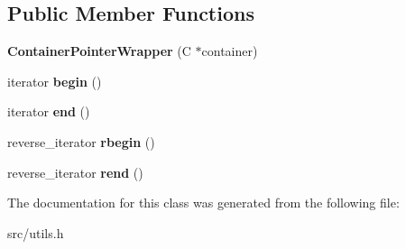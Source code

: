 \subsection*{Public Member Functions}
\begin{DoxyCompactItemize}
\item 
\hypertarget{classv8_1_1internal_1_1_container_pointer_wrapper_a42e8d763ac8c248f1d691b44f24d027d}{}{\bfseries Container\+Pointer\+Wrapper} (C $\ast$container)\label{classv8_1_1internal_1_1_container_pointer_wrapper_a42e8d763ac8c248f1d691b44f24d027d}

\item 
\hypertarget{classv8_1_1internal_1_1_container_pointer_wrapper_a7428d83a7ed448222fbb05c83883f88c}{}iterator {\bfseries begin} ()\label{classv8_1_1internal_1_1_container_pointer_wrapper_a7428d83a7ed448222fbb05c83883f88c}

\item 
\hypertarget{classv8_1_1internal_1_1_container_pointer_wrapper_aff211e5a08e2fa08945806955dc7d71b}{}iterator {\bfseries end} ()\label{classv8_1_1internal_1_1_container_pointer_wrapper_aff211e5a08e2fa08945806955dc7d71b}

\item 
\hypertarget{classv8_1_1internal_1_1_container_pointer_wrapper_a3ce6f3e2bdba0ddea8d91451bf1a9fc8}{}reverse\+\_\+iterator {\bfseries rbegin} ()\label{classv8_1_1internal_1_1_container_pointer_wrapper_a3ce6f3e2bdba0ddea8d91451bf1a9fc8}

\item 
\hypertarget{classv8_1_1internal_1_1_container_pointer_wrapper_a98b395b29d890fb1affea87f620bb381}{}reverse\+\_\+iterator {\bfseries rend} ()\label{classv8_1_1internal_1_1_container_pointer_wrapper_a98b395b29d890fb1affea87f620bb381}

\end{DoxyCompactItemize}


The documentation for this class was generated from the following file\+:\begin{DoxyCompactItemize}
\item 
src/utils.\+h\end{DoxyCompactItemize}
